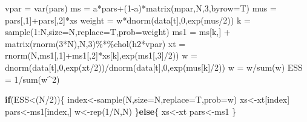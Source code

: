 \documentclass[
]{book}
\newenvironment{Shaded}{\begin{snugshade}}{\end{snugshade}}
\newcommand{\AttributeTok}[1]{\textcolor[rgb]{0.77,0.63,0.00}{#1}}
\newcommand{\ControlFlowTok}[1]{\textcolor[rgb]{0.13,0.29,0.53}{\textbf{#1}}}
\newcommand{\DecValTok}[1]{\textcolor[rgb]{0.00,0.00,0.81}{#1}}
\newcommand{\FunctionTok}[1]{\textcolor[rgb]{0.00,0.00,0.00}{#1}}
\newcommand{\NormalTok}[1]{#1}
\newcommand{\OtherTok}[1]{\textcolor[rgb]{0.56,0.35,0.01}{#1}}
\newcommand{\SpecialCharTok}[1]{\textcolor[rgb]{0.00,0.00,0.00}{#1}}
\theoremstyle{break}
\theoremstyle{nonumberplain}
\begin{document}
\begin{Shaded}
\begin{Highlighting}[]
\NormalTok{    vpar     }\OtherTok{=} \FunctionTok{var}\NormalTok{(pars)}
\NormalTok{    ms          }\OtherTok{=}\NormalTok{ a}\SpecialCharTok{*}\NormalTok{pars}\SpecialCharTok{+}\NormalTok{(}\DecValTok{1}\SpecialCharTok{{-}}\NormalTok{a)}\SpecialCharTok{*}\FunctionTok{matrix}\NormalTok{(mpar,N,}\DecValTok{3}\NormalTok{,}\AttributeTok{byrow=}\NormalTok{T)}
\NormalTok{    mus         }\OtherTok{=}\NormalTok{ pars[,}\DecValTok{1}\NormalTok{]}\SpecialCharTok{+}\NormalTok{pars[,}\DecValTok{2}\NormalTok{]}\SpecialCharTok{*}\NormalTok{xs }
\NormalTok{    weight      }\OtherTok{=}\NormalTok{ w}\SpecialCharTok{*}\FunctionTok{dnorm}\NormalTok{(data[t],}\DecValTok{0}\NormalTok{,}\FunctionTok{exp}\NormalTok{(mus}\SpecialCharTok{/}\DecValTok{2}\NormalTok{))}
\NormalTok{    k           }\OtherTok{=} \FunctionTok{sample}\NormalTok{(}\DecValTok{1}\SpecialCharTok{:}\NormalTok{N,}\AttributeTok{size=}\NormalTok{N,}\AttributeTok{replace=}\NormalTok{T,}\AttributeTok{prob=}\NormalTok{weight)}
\NormalTok{    ms1         }\OtherTok{=}\NormalTok{ ms[k,] }\SpecialCharTok{+} \FunctionTok{matrix}\NormalTok{(}\FunctionTok{rnorm}\NormalTok{(}\DecValTok{3}\SpecialCharTok{*}\NormalTok{N),N,}\DecValTok{3}\NormalTok{)}\SpecialCharTok{\%*\%}\FunctionTok{chol}\NormalTok{(h2}\SpecialCharTok{*}\NormalTok{vpar)}
\NormalTok{    xt          }\OtherTok{=} \FunctionTok{rnorm}\NormalTok{(N,ms1[,}\DecValTok{1}\NormalTok{]}\SpecialCharTok{+}\NormalTok{ms1[,}\DecValTok{2}\NormalTok{]}\SpecialCharTok{*}\NormalTok{xs[k],}\FunctionTok{exp}\NormalTok{(ms1[,}\DecValTok{3}\NormalTok{]}\SpecialCharTok{/}\DecValTok{2}\NormalTok{))}
\NormalTok{    w           }\OtherTok{=} \FunctionTok{dnorm}\NormalTok{(data[t],}\DecValTok{0}\NormalTok{,}\FunctionTok{exp}\NormalTok{(xt}\SpecialCharTok{/}\DecValTok{2}\NormalTok{))}\SpecialCharTok{/}\FunctionTok{dnorm}\NormalTok{(data[t],}\DecValTok{0}\NormalTok{,}\FunctionTok{exp}\NormalTok{(mus[k]}\SpecialCharTok{/}\DecValTok{2}\NormalTok{))}
\NormalTok{    w           }\OtherTok{=}\NormalTok{ w}\SpecialCharTok{/}\FunctionTok{sum}\NormalTok{(w)}
\NormalTok{    ESS         }\OtherTok{=} \DecValTok{1}\SpecialCharTok{/}\FunctionTok{sum}\NormalTok{(w}\SpecialCharTok{\^{}}\DecValTok{2}\NormalTok{)}
    
    
    \ControlFlowTok{if}\NormalTok{(ESS}\SpecialCharTok{\textless{}}\NormalTok{(N}\SpecialCharTok{/}\DecValTok{2}\NormalTok{))\{}
\NormalTok{      index}\OtherTok{\textless{}{-}}\FunctionTok{sample}\NormalTok{(N,}\AttributeTok{size=}\NormalTok{N,}\AttributeTok{replace=}\NormalTok{T,}\AttributeTok{prob=}\NormalTok{w)}
\NormalTok{      xs}\OtherTok{\textless{}{-}}\NormalTok{xt[index]}
\NormalTok{      pars}\OtherTok{\textless{}{-}}\NormalTok{ms1[index,]}
\NormalTok{      w}\OtherTok{\textless{}{-}}\FunctionTok{rep}\NormalTok{(}\DecValTok{1}\SpecialCharTok{/}\NormalTok{N,N)}
\NormalTok{    \}}\ControlFlowTok{else}\NormalTok{\{}
\NormalTok{      xs}\OtherTok{\textless{}{-}}\NormalTok{xt}
\NormalTok{      pars}\OtherTok{\textless{}{-}}\NormalTok{ms1}
\NormalTok{    \}}
    

\end{Highlighting}
\end{Shaded}
\end{document}
